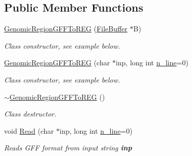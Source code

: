 \subsection*{Public Member Functions}
\begin{DoxyCompactItemize}
\item 
\hypertarget{classGenomicRegionGFFToREG_a8ad38850fd8e7e19aabca0bf2ba62d55}{
\hyperlink{classGenomicRegionGFFToREG_a8ad38850fd8e7e19aabca0bf2ba62d55}{GenomicRegionGFFToREG} (\hyperlink{classFileBuffer}{FileBuffer} $\ast$B)}
\label{classGenomicRegionGFFToREG_a8ad38850fd8e7e19aabca0bf2ba62d55}

\begin{DoxyCompactList}\small\item\em Class constructor, see example below. \end{DoxyCompactList}\item 
\hypertarget{classGenomicRegionGFFToREG_afa25d23d19de119347fe6970913398b8}{
\hyperlink{classGenomicRegionGFFToREG_afa25d23d19de119347fe6970913398b8}{GenomicRegionGFFToREG} (char $\ast$inp, long int \hyperlink{classGenomicRegion_aefe2255aeed5338060190ded05cb9c0c}{n\_\-line}=0)}
\label{classGenomicRegionGFFToREG_afa25d23d19de119347fe6970913398b8}

\begin{DoxyCompactList}\small\item\em Class constructor, see example below. \end{DoxyCompactList}\item 
\hypertarget{classGenomicRegionGFFToREG_a5a41c3de64cd8ad69952b77805816c5e}{
\hyperlink{classGenomicRegionGFFToREG_a5a41c3de64cd8ad69952b77805816c5e}{$\sim$GenomicRegionGFFToREG} ()}
\label{classGenomicRegionGFFToREG_a5a41c3de64cd8ad69952b77805816c5e}

\begin{DoxyCompactList}\small\item\em Class destructor. \end{DoxyCompactList}\item 
\hypertarget{classGenomicRegionGFFToREG_abc519dd06e8d03711b90679ec279be3b}{
void \hyperlink{classGenomicRegionGFFToREG_abc519dd06e8d03711b90679ec279be3b}{Read} (char $\ast$inp, long int \hyperlink{classGenomicRegion_aefe2255aeed5338060190ded05cb9c0c}{n\_\-line}=0)}
\label{classGenomicRegionGFFToREG_abc519dd06e8d03711b90679ec279be3b}

\begin{DoxyCompactList}\small\item\em Reads GFF format from input string {\bfseries inp} \end{DoxyCompactList}\end{DoxyCompactItemize}


